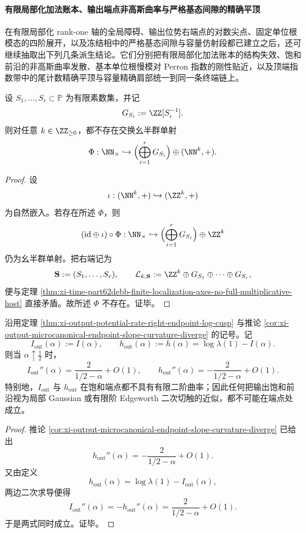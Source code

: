 \paragraph{有限局部化加法账本、输出端点非高斯曲率与严格基态间隙的精确平顶}
在有限局部化 rank-one 轴的全局障碍、输出位势右端点的对数尖点、固定单位根模态的四阶展开，以及冻结相中的严格基态间隙与容量仿射段都已建立之后，还可继续抽取出下列几条派生结论。它们分别把有限局部化加法账本的结构失效、饱和前沿的非高斯曲率发散、基本单位根慢模对 Perron 指数的刚性贴近，以及顶端指数带中的尾计数精确平顶与容量精确肩部统一到同一条终端链上。

\begin{theorem}[有限局部化圆因子与有限加法寄存器不足以忠实线性化完整乘法]\label{thm:xi-time-part9w-finite-localized-additive-ledger-obstruction}
设 \(S_1,\dots,S_r\subset\mathbb P\) 为有限素数集，并记
\[
G_{S_i}:=\ZZ[S_i^{-1}].
\]
则对任意 \(k\in\ZZ_{\ge 0}\)，都不存在交换幺半群单射
\[
\Phi:\NN_{\times}\hookrightarrow
\Bigl(\bigoplus_{i=1}^{r}G_{S_i}\Bigr)\oplus(\NN^k,+).
\]
\end{theorem}
\begin{proof}
设
\[
\iota:(\NN^k,+)\hookrightarrow(\ZZ^k,+)
\]
为自然嵌入。若存在所述 \(\Phi\)，则
\[
(\mathrm{id}\oplus\iota)\circ\Phi:
\NN_{\times}\hookrightarrow
\Bigl(\bigoplus_{i=1}^{r}G_{S_i}\Bigr)\oplus\ZZ^k
\]
仍为幺半群单射。把右端记为
\[
\mathbf S:=(S_1,\dots,S_r),
\qquad
\mathcal L_{k,\mathbf S}:=\ZZ^k\oplus G_{S_1}\oplus\cdots\oplus G_{S_r},
\]
便与定理 \ref{thm:xi-time-part62debb-finite-localization-axes-no-full-multiplicative-host} 直接矛盾。故所述 \(\Phi\) 不存在。证毕。
\end{proof}

\begin{corollary}\label{cor:xi-time-part9w-output-frontier-no-finite-gaussian-tangent}
沿用定理 \ref{thm:xi-output-potential-rate-right-endpoint-log-cusp} 与推论 \ref{cor:xi-output-microcanonical-endpoint-slope-curvature-diverge} 的记号。记
\[
I_{\mathrm{out}}(\alpha):=I(\alpha),
\qquad
h_{\mathrm{out}}(\alpha):=h(\alpha)=\log\lambda(1)-I(\alpha).
\]
则当 \(\alpha\uparrow\tfrac12\) 时，
\[
I_{\mathrm{out}}''(\alpha)=\frac{2}{1/2-\alpha}+O(1),
\qquad
h_{\mathrm{out}}''(\alpha)=-\frac{2}{1/2-\alpha}+O(1).
\]
特别地，\(I_{\mathrm{out}}\) 与 \(h_{\mathrm{out}}\) 在饱和端点都不具有有限二阶曲率；因此任何把输出饱和前沿视为局部 Gaussian 或有限阶 Edgeworth 二次切触的近似，都不可能在端点处成立。
\end{corollary}
\begin{proof}
推论 \ref{cor:xi-output-microcanonical-endpoint-slope-curvature-diverge} 已给出
\[
h_{\mathrm{out}}''(\alpha)=-\frac{2}{1/2-\alpha}+O(1).
\]
又由定义
\[
h_{\mathrm{out}}(\alpha)=\log\lambda(1)-I_{\mathrm{out}}(\alpha),
\]
两边二次求导便得
\[
I_{\mathrm{out}}''(\alpha)=-h_{\mathrm{out}}''(\alpha)
=\frac{2}{1/2-\alpha}+O(1).
\]
于是两式同时成立。证毕。
\end{proof}

